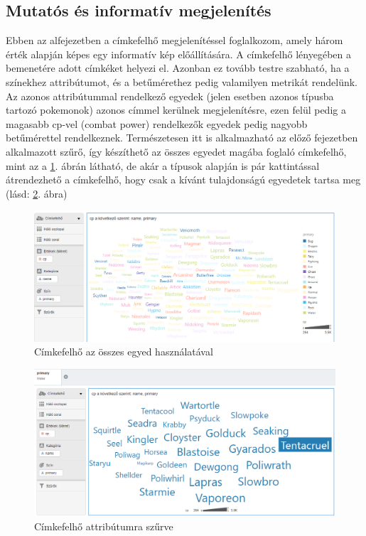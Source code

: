 	\subsection{Mutatós és informatív megjelenítés}
	Ebben az alfejezetben a címkefelhő megjelenítéssel foglalkozom, amely három érték alapján képes egy informatív kép előállítására. A címkefelhő lényegében a bemenetére adott címkéket helyezi el. Azonban ez tovább testre szabható, ha a színekhez attribútumot, és a betűmérethez pedig valamilyen metrikát rendelünk. Az azonos attribútummal rendelkező egyedek (jelen esetben azonos típusba tartozó pokemonok) azonos címmel kerülnek megjelenítésre, ezen felül pedig a magasabb cp-vel (combat power) rendelkezők egyedek pedig nagyobb betűmérettel rendelkeznek. Természetesen itt is alkalmazható az előző fejezetben alkalmazott szűrő, így készíthető az összes egyedet magába foglaló címkefelhő, mint az a \ref{fig:pokedatacime}. ábrán látható, de akár a típusok alapján is pár kattintással átrendezhető a címkefelhő, hogy csak a kívánt tulajdonságú egyedetek tartsa meg (lásd: \ref{fig:pokedatacimefiltered}. ábra)
	\begin{figure}
		\centering
		\includegraphics[width=0.7\linewidth]{dani_imgs/poke_data_cime}
		\caption{Címkefelhő az összes egyed használatával}
		\label{fig:pokedatacime}
	\end{figure}
	
	\begin{figure}
		\centering
		\includegraphics[width=0.7\linewidth]{dani_imgs/poke_data_cime_filtered}
		\caption{Címkefelhő attribútumra szűrve}
		\label{fig:pokedatacimefiltered}
	\end{figure}
	
	
	